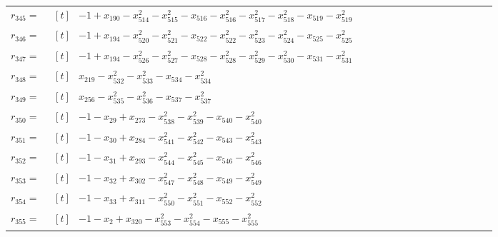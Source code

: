 \begin{longtable}{@{}r p{0.92\linewidth}@{}}
$r_{345}=$ & $\begin{aligned}[t]&-1+x_{190}-x_{514}^{2}-x_{515}^{2}-x_{516}-x_{516}^{2}-x_{517}^{2}-x_{518}^{2}-x_{519}-x_{519}^{2}\end{aligned}$ \\[2pt]
$r_{346}=$ & $\begin{aligned}[t]&-1+x_{194}-x_{520}^{2}-x_{521}^{2}-x_{522}-x_{522}^{2}-x_{523}^{2}-x_{524}^{2}-x_{525}-x_{525}^{2}\end{aligned}$ \\[2pt]
$r_{347}=$ & $\begin{aligned}[t]&-1+x_{194}-x_{526}^{2}-x_{527}^{2}-x_{528}-x_{528}^{2}-x_{529}^{2}-x_{530}^{2}-x_{531}-x_{531}^{2}\end{aligned}$ \\[2pt]
$r_{348}=$ & $\begin{aligned}[t]&x_{219}-x_{532}^{2}-x_{533}^{2}-x_{534}-x_{534}^{2}\end{aligned}$ \\[2pt]
$r_{349}=$ & $\begin{aligned}[t]&x_{256}-x_{535}^{2}-x_{536}^{2}-x_{537}-x_{537}^{2}\end{aligned}$ \\[2pt]
$r_{350}=$ & $\begin{aligned}[t]&-1-x_{29}+x_{273}-x_{538}^{2}-x_{539}^{2}-x_{540}-x_{540}^{2}\end{aligned}$ \\[2pt]
$r_{351}=$ & $\begin{aligned}[t]&-1-x_{30}+x_{284}-x_{541}^{2}-x_{542}^{2}-x_{543}-x_{543}^{2}\end{aligned}$ \\[2pt]
$r_{352}=$ & $\begin{aligned}[t]&-1-x_{31}+x_{293}-x_{544}^{2}-x_{545}^{2}-x_{546}-x_{546}^{2}\end{aligned}$ \\[2pt]
$r_{353}=$ & $\begin{aligned}[t]&-1-x_{32}+x_{302}-x_{547}^{2}-x_{548}^{2}-x_{549}-x_{549}^{2}\end{aligned}$ \\[2pt]
$r_{354}=$ & $\begin{aligned}[t]&-1-x_{33}+x_{311}-x_{550}^{2}-x_{551}^{2}-x_{552}-x_{552}^{2}\end{aligned}$ \\[2pt]
$r_{355}=$ & $\begin{aligned}[t]&-1-x_{2}+x_{320}-x_{553}^{2}-x_{554}^{2}-x_{555}-x_{555}^{2}\end{aligned}$ \\[2pt]

\end{longtable}
